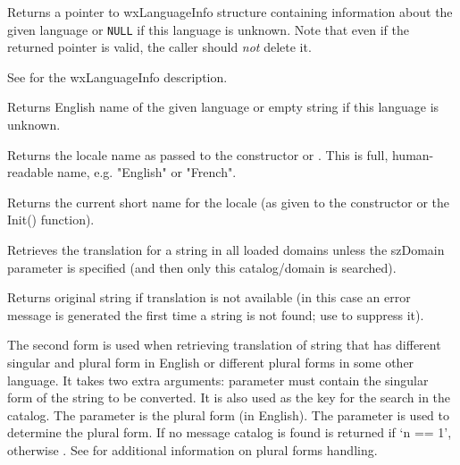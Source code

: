 Returns a pointer to wxLanguageInfo structure containing information about the
given language or {\tt NULL} if this language is unknown. Note that even if the
returned pointer is valid, the caller should {\it not} delete it.

See  for the wxLanguageInfo
description.

\label{wxlocalegetlanguagename}


Returns English name of the given language or empty string if this
language is unknown.


\label{wxlocalegetlocale}


Returns the locale name as passed to the constructor or 
. This is full, human-readable name,
e.g. "English" or "French".


\label{wxlocalegetname}


Returns the current short name for the locale (as given to the constructor or
the Init() function).

\label{wxlocalegetstring}



Retrieves the translation for a string in all loaded domains unless the szDomain
parameter is specified (and then only this catalog/domain is searched).

Returns original string if translation is not available
(in this case an error message is generated the first time
a string is not found; use  to suppress it).

The second form is used when retrieving translation of string that has
different singular and plural form in English or different plural forms in some
other language. It takes two extra arguments: 
parameter must contain the singular form of the string to be converted.
It is also used as the key for the search in the catalog.
The  parameter is the plural form (in English).
The parameter  is used to determine the plural form.  If no
message catalog is found  is returned if `n == 1',
otherwise .
See  for additional information on plural forms handling.

